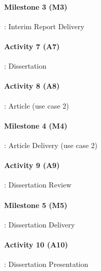 \paragraph{Milestone 3 (M3)}: Interim Report Delivery \mbox{}\\

\paragraph{Activity 7 (A7)}: Dissertation \mbox{}\\

\paragraph{Activity 8 (A8)}: Article (use case 2)\mbox{}\\

\paragraph{Milestone 4 (M4)}: Article Delivery (use case 2)\mbox{}\\

\paragraph{Activity 9 (A9)}: Dissertation Review\mbox{}\\

\paragraph{Milestone 5 (M5)}: Dissertation Delivery \mbox{}\\

\paragraph{Activity 10 (A10)}: Dissertation Presentation \mbox{}\\

